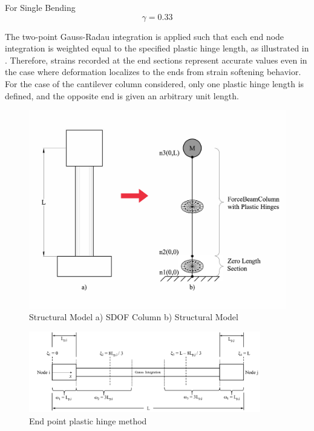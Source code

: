 For Single Bending
\begin{equation}
    \gamma=0.33
    \label{eq:Gamma_LPt}
\end{equation}

The two-point Gauss-Radau integration is applied such that each end node integration is weighted equal to the specified plastic hinge length, as illustrated in . Therefore, strains recorded at the end sections represent accurate values even in the case where deformation localizes to the ends from strain softening behavior. For the case of the cantilever column considered, only one plastic hinge length is defined, and the opposite end is given an arbitrary unit length. 

\begin{figure}[htbp]
	\centering
	\includegraphics[width=1.0\textwidth]{Chapter-5/figs/StructuralModel_01}
	\caption{Structural Model a) SDOF Column b) Structural Model}
	\label{fig:Structural_Model}
\end{figure}

\begin{figure}[htbp]
	\centering
	\includegraphics[width=0.9\textwidth]{Chapter-5/figs/fbc_PlasticHinge}
	\caption{End point plastic hinge method \cite{Scott}}
	\label{fig:Fiber_PlasticHinge}
\end{figure}

